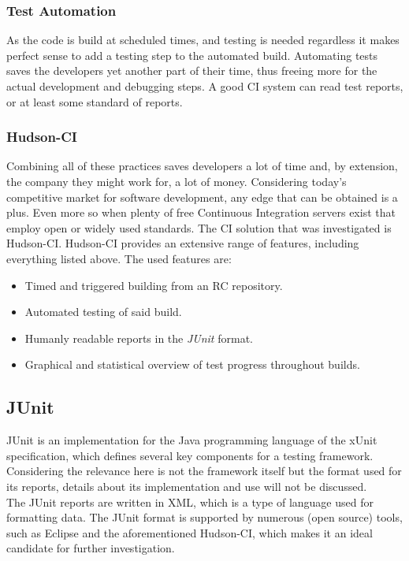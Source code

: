 \documentclass[11pt,british]{article}
\begin{document}
\subsubsection{Test Automation}
As the code is build at scheduled times, and testing is needed regardless it makes perfect sense to add a testing step to the automated build. Automating tests saves the developers yet another part of their time, thus freeing more for the actual development and debugging steps. A good \gls{CI} system can read test reports, or at least some standard of reports. 

\subsubsection{Hudson-CI}
Combining all of these practices saves developers a lot of time and, by extension, the company they might work for, a lot of money. Considering today's competitive market for software development, any edge that can be obtained is a plus. Even more so when plenty of free Continuous Integration servers exist that employ open or widely used standards. The \gls{CI} solution that was investigated is Hudson-CI. Hudson-CI provides an extensive range of features, including everything listed above. The used features are:
\begin{itemize}
\item Timed and triggered building from an \gls{RC} repository.
\item Automated testing of said build.
\item Humanly readable reports in the \emph{JUnit} format.
\item Graphical and statistical overview of test progress throughout builds.
\end{itemize}

\subsection{JUnit}
JUnit is an implementation for the Java programming language of the xUnit specification, which defines several key components for a testing framework. Considering the relevance here is not the framework itself but the format used for its reports, details about its implementation and use will not be discussed.\\
The JUnit reports are written in \gls{XML}, which is a type of language used for formatting data. The JUnit format is supported by numerous (open source) tools, such as Eclipse and the aforementioned Hudson-CI, which makes it an ideal candidate for further investigation. 
\end{document}
